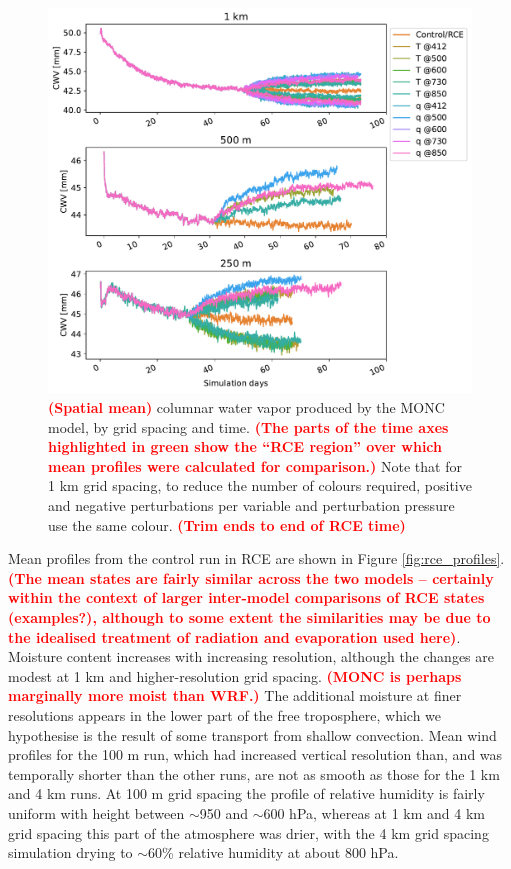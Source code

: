 \documentclass[draft]{agujournal2019}
\newcommand{\todo}[1]{\textcolor{red}{\textbf{(#1)}}}
\begin{document}
\begin{figure}[pth]
    \noindent\includegraphics[width=\textwidth]{figures/RCE_CWV_MONC}
    \caption{\todo{Spatial mean} columnar water vapor produced by the MONC
    model, by grid spacing and time. \todo{The parts of the time axes
    highlighted in green show the ``RCE region'' over which mean profiles were
    calculated for comparison.} Note that for 1 km grid spacing, to reduce the
    number of colours required, positive and negative perturbations per variable
    and perturbation pressure use the same colour. \todo{Trim ends to end of RCE
    time}}
    \label{fig:rce_pw}
\end{figure}

Mean profiles from the control run in RCE are shown in Figure
\ref{fig:rce_profiles}. \todo{The mean states are fairly similar across the two
models -- certainly within the context of larger inter-model comparisons of RCE
states (examples?), although to some extent the similarities may be due to the
idealised treatment of radiation and evaporation used here}. Moisture content
increases with increasing resolution, although the changes are modest at 1 km
and higher-resolution grid spacing. \todo{MONC is perhaps marginally more moist
than WRF.} The additional moisture at finer resolutions appears in the lower
part of the free troposphere, which we hypothesise is the result of some
transport from shallow convection. Mean wind profiles for the 100 m run, which
had increased vertical resolution than, and was temporally shorter than the
other runs, are not as smooth as those for the 1 km and 4 km runs. At 100 m grid
spacing the profile of relative humidity is fairly uniform with height between
$\sim$950 and $\sim$600 hPa, whereas at 1 km and 4 km grid spacing this part of
the atmosphere was drier, with the 4 km grid spacing simulation drying to
$\sim$60\% relative humidity at about 800 hPa.
\end{document}
